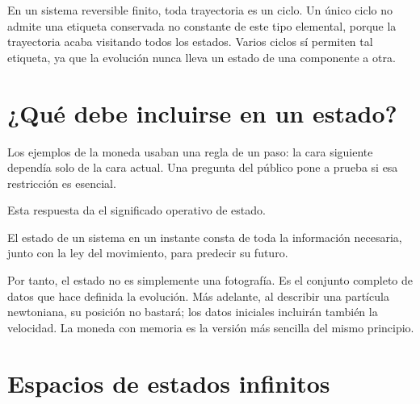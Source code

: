 En un sistema reversible finito, toda trayectoria es un ciclo. Un único ciclo
no admite una etiqueta conservada no constante de este tipo elemental, porque la
trayectoria acaba visitando todos los estados. Varios ciclos sí permiten tal
etiqueta, ya que la evolución nunca lleva un estado de una componente a otra.

\section{¿Qué debe incluirse en un estado?}

Los ejemplos de la moneda usaban una regla de un paso: la cara siguiente dependía
solo de la cara actual. Una pregunta del público pone a prueba si esa restricción
es esencial.

\begin{classroomqa}

\end{classroomqa}

Esta respuesta da el significado operativo de estado.

\begin{definition}
El estado de un sistema en un instante consta de toda la información necesaria,
junto con la ley del movimiento, para predecir su futuro.
\end{definition}

Por tanto, el estado no es simplemente una fotografía. Es el conjunto completo
de datos que hace definida la evolución. Más adelante, al describir una partícula
newtoniana, su posición no bastará; los datos iniciales incluirán también la
velocidad. La moneda con memoria es la versión más sencilla del mismo principio.

\section{Espacios de estados infinitos}

